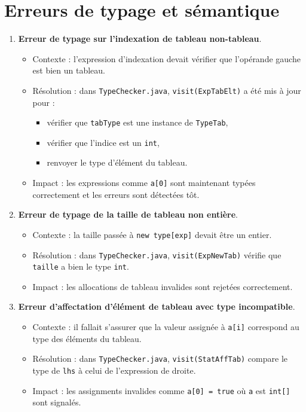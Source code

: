 \documentclass[a4paper,11pt]{article}
\begin{document}
\section{Erreurs de typage et sémantique}
\begin{enumerate}[label=\arabic*)]
  \item \textbf{Erreur de typage sur l'indexation de tableau non-tableau}.
  \begin{itemize}
    \item Contexte : l'expression d'indexation devait vérifier que l'opérande gauche est bien un tableau.
    \item Résolution : dans \texttt{TypeChecker.java}, \texttt{visit(ExpTabElt)} a été mis à jour pour :
    \begin{itemize}
      \item vérifier que \texttt{tabType} est une instance de \texttt{TypeTab},
      \item vérifier que l'indice est un \texttt{int},
      \item renvoyer le type d'élément du tableau.
    \end{itemize}
    \item Impact : les expressions comme \texttt{a[0]} sont maintenant typées correctement et les erreurs sont détectées tôt.
  \end{itemize}

  \item \textbf{Erreur de typage de la taille de tableau non entière}.
  \begin{itemize}
    \item Contexte : la taille passée à \texttt{new type[exp]} devait être un entier.
    \item Résolution : dans \texttt{TypeChecker.java}, \texttt{visit(ExpNewTab)} vérifie que \texttt{taille} a bien le type \texttt{int}.
    \item Impact : les allocations de tableau invalides sont rejetées correctement.
  \end{itemize}

  \item \textbf{Erreur d'affectation d'élément de tableau avec type incompatible}.
  \begin{itemize}
    \item Contexte : il fallait s'assurer que la valeur assignée à \texttt{a[i]} correspond au type des éléments du tableau.
    \item Résolution : dans \texttt{TypeChecker.java}, \texttt{visit(StatAffTab)} compare le type de \texttt{lhs} à celui de l'expression de droite.
    \item Impact : les assignments invalides comme \texttt{a[0] = true} où \texttt{a} est \texttt{int[]} sont signalés.
  \end{itemize}


\end{enumerate}
\end{document}
